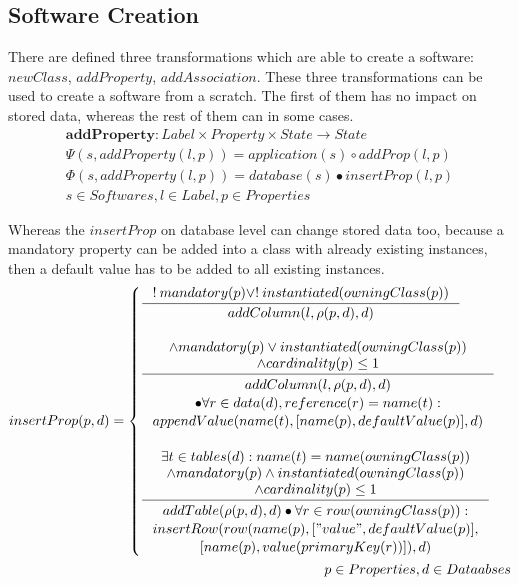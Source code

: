\documentclass[11pt]{article}
\begin{document}
\subsection{Software Creation}
There are defined three transformations which are able to create a software: $newClass$, $addProperty$, $addAssociation$. These three transformations can be used to create a software from a scratch. The first of them has no impact on stored data, whereas the rest of them can in some cases.
\begin{align*}
\mathbf{addProperty} : Label \times Property \times State \rightarrow State \\
\Psi(s, addProperty(l, p)) = application(s) \circ addProp(l,p) \\
\Phi(s, addProperty(l, p)) = database(s) \bullet insertProp(l, p) \\
s \in Softwares, l \in Label, p \in Properties
\end{align*}

Whereas the $insertProp$ on database level can change stored data too, because a mandatory property can be added into a class with already existing instances, then a default value has to be added to all existing instances.
\begin{align*}
insertProp(p, d) = \begin{cases}
\inference{!\:mandatory(p) \vee !\:instantiated(owningClass(p))}{addColumn(l, \rho(p,d), d)} 
\\ \\ 
\inference{ \wedge mandatory(p) \vee instantiated(owningClass(p)) \\ \wedge cardinality(p) \leq 1}{\begin{gathered} addColumn(l, \rho(p,d), d) \\ \bullet \forall r \in data(d), reference(r) = name(t) : \\ appendValue(name(t), [name(p), defaultValue(p)], d)
\end{gathered}
} 
\\ \\
\inference{ \exists t \in tables(d) : name(t) = name(owningClass(p)) \\ \wedge mandatory(p) \wedge instantiated(owningClass(p)) \\ \wedge cardinality(p) \leq 1}{\begin{gathered}
addTable(\rho(p,d), d) \bullet \forall r \in row(owningClass(p)) :\\ insertRow(row(name(p), ["value", defaultValue(p)], \\ [name(p), value(primaryKey(r))]),d) 
\end{gathered}
} 
\end{cases}\\
p \in Properties, d \in Dataabses
\end{align*}
\end{document}
